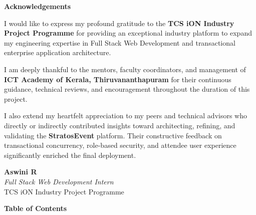\documentclass[11pt,a4paper]{article}
\begin{document}
\endgroup


\newpage
\thispagestyle{fancy}

\vspace*{0.2in}

{\color{TitleBlue}\bfseries
 \fontsize{18}{22}\selectfont
 Acknowledgements\par}

\vspace{0.2in}

\noindent
I would like to express my profound gratitude to the \textbf{TCS iON Industry Project Programme} for providing an exceptional industry platform to expand my engineering expertise in Full Stack Web Development and transactional enterprise application architecture.

\vspace{0.12in}
\noindent
I am deeply thankful to the mentors, faculty coordinators, and management of \textbf{ICT Academy of Kerala, Thiruvananthapuram} for their continuous guidance, technical reviews, and encouragement throughout the duration of this project.

\vspace{0.12in}
\noindent
I also extend my heartfelt appreciation to my peers and technical advisors who directly or indirectly contributed insights toward architecting, refining, and validating the \textbf{StratosEvent} platform. Their constructive feedback on transactional concurrency, role-based security, and attendee user experience significantly enriched the final deployment.

\vspace{0.45in}
\begin{flushright}
  \textbf{Aswini R}\\
  \textit{Full Stack Web Development Intern}\\
  TCS iON Industry Project Programme
\end{flushright}


\newpage
\thispagestyle{fancy}

\vspace*{0.2in}

{\color{TitleBlue}\bfseries
 \fontsize{18}{22}\selectfont
 Table of Contents\par}
\end{document}
